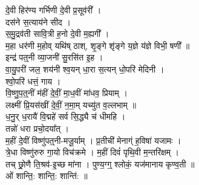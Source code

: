 दे॒वी हिर॑ण्य गर्भिणी दे॒वी प्र॒सूव॑री᳚ ।\\
दस॑ने स॒त्याय॑ने सीद ।\\
स॒मु॒द्रव॑ती सावि॒त्री ह॒नो दे॒वी म॒ह्यगी᳚ ।\\
म॒हा धर॑णी म॒होव् यथि॑ष् ठाश्, शृ॒ङ्गे शृ॑ङ्गे य॒ज्ञे य॑ज्ञे विभी॒ षणी᳚ ॥\\
इन्द्र॑ पत्॒नी व्या॒जनी॑ सु॒रसि॑त इ॒ह ।\\
वा॒यु॒परी॑ जल॒ शय॑नी {\small{}} श्व॒यन् धा॒रा स॒त्यन् धो॒परि॑ मेदिनी ।\\
श्वो॒परि॑ धत्तं॒ गाय ।\\
वि॒ष्णु॒प॒त्॒नीं म॑हीं दे॒वीं॒ मा॒ध॒वीं मा॑धव॒ प्रियाम् ।\\
लक्ष्मीं प्रि॒यस॑खीं दे॒वीं॒ न॒मा॒म् यच्यु॑त व॒ल्लभाम् ॥\\
ध॒नु॒र् ध॒रायै॑ वि॒द्महे॑ सर्व सि॒द्ध्यै च॑ धीमहि ।\\
तन्नो॑ धरा प्रचो॒दया᳚त् ।\\
म॒हीं दे॒वीं विष्णु॑पत्॒नी-मजू॒र्याम् । प्र॒तीची॑ मेनाग्ं ह॒विषा॑ यजामः ।\\
त्रे॒धा विष्णु॑रुरु गा॒यो विच॑क्रमे । म॒हीं दिवं॑ पृथि॒वी म॒न्तरि॑क्षम् ।\\
तच् छ्रो॒णै ति॒श्रव॑-इ॒च्छ मा॑ना । पुण्य॒ग्ग्॒ श्लोकं॒ यज॑मानाय कृण्व॒ती ॥\\
ओं शान्ति॒: शान्ति॒: शान्ति॑: ॥\\
